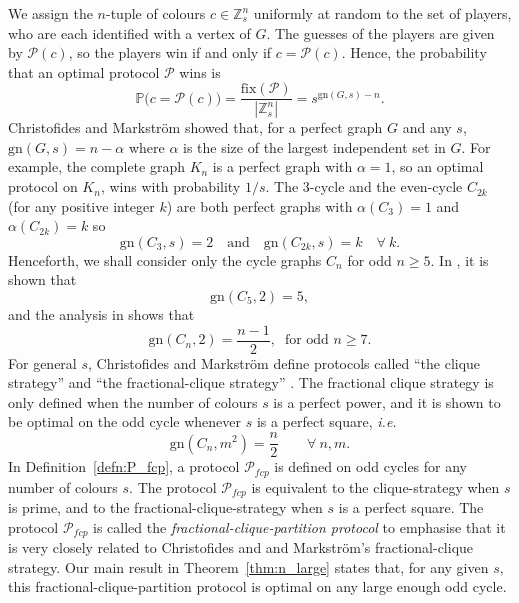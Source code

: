 \documentclass{birkjour}
\theoremstyle{indenteddefinition}
\theoremstyle{indenteddefinition}
\numberwithin{equation}{section}
\renewcommand{\P}{\mathbb{P}}
\renewcommand{\Pr}{\mathcal{P}}
\newcommand{\Z}{\mathbb{Z}}
\newcommand{\fix}{\mbox{fix}}
\newcommand{\gn}{\mbox{gn}}
\begin{document}
We assign the $n$-tuple of colours $c \in \Z_s^n$ uniformly at random to the set of players, who are each identified with a vertex of $G$.
The guesses of the players are given by $\Pr(c)$, so the players win if and only if $c = \Pr(c)$. Hence, the probability that an optimal protocol $\Pr$ wins is
	$$ \P\big(c = \Pr(c)\big) = \frac{\fix(\Pr)}{|\Z_s^n|} = s^{\gn(G,s)-n}. $$
Christofides and Markstr\"{o}m \cite{Christofides2011guessing} showed that, for a perfect graph $G$ and any $s$, $\gn(G,s) = n-\alpha$ where $\alpha$ is the size of the largest independent set in $G$. For example, the complete graph $K_n$ is a perfect graph with $\alpha = 1$, so an optimal protocol on $K_n$, wins with probability $1/s$. The $3$-cycle and the even-cycle $C_{2k}$ (for any positive integer $k$) are both perfect graphs with $\alpha(C_3)=1$ and $\alpha(C_{2k})=k$ so 
	\begin{equation}
	\label{eq:perfect_graphs}
	\gn(C_3,s) = 2 \quad \mbox{and} \quad \gn(C_{2k},s)=k \quad \forall \: k. 
	\end{equation}
Henceforth, we shall consider only the cycle graphs $C_n$ for odd $n \geq 5$. In \cite{Christofides2011guessing}, it is shown that $$\gn(C_5,2) =5,$$
and the analysis in \cite{bar2011index} shows that
$$\gn(C_n,2) = \frac{n-1}{2},\;\; \mbox{for odd }n\geq 7. $$
For general $s$, Christofides and Markstr\"{o}m define protocols called ``the clique strategy'' and ``the fractional-clique strategy'' \cite{Christofides2011guessing}. The fractional clique strategy is only defined when the number of colours $s$ is a perfect power, and it is shown to be optimal on the odd cycle whenever $s$ is a perfect square, {\it i.e.} 
	\begin{equation}
	\label{eq:s_square}
	\gn(C_n,m^2) = \frac{n}{2} \qquad \forall \: n,m. 
	\end{equation}
In Definition~\ref{defn:P_fcp}, a protocol $\Pr_{fcp}$ is defined on odd cycles for any number of colours $s$. The protocol $\Pr_{fcp}$ is equivalent to the clique-strategy when $s$ is prime, and to the fractional-clique-strategy when $s$ is a perfect square. The protocol $\Pr_{fcp}$ is called the \emph{fractional-clique-partition protocol} to emphasise that it is very closely related to Christofides and and Markstr\"{o}m's fractional-clique strategy. Our main result in Theorem~\ref{thm:n_large} states that, for any given $s$, this fractional-clique-partition protocol is optimal on any large enough odd cycle.
\end{document}
